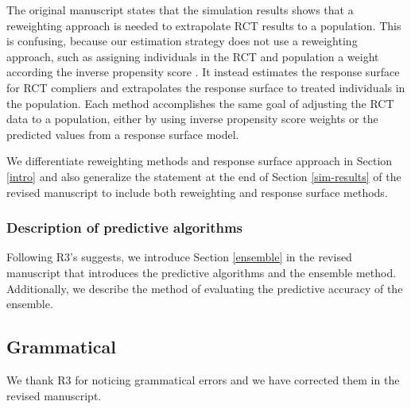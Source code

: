 \documentclass[hidelinks,12pt,letterpaper]{article}
\begin{document}
The original manuscript states that the simulation results shows that a reweighting approach is needed to extrapolate RCT results to a population. This is confusing, because our estimation strategy does not use a reweighting approach, such as assigning individuals in the RCT and population a weight according the inverse propensity score \citep{stuart2011use}. It instead estimates the response surface for RCT compliers and extrapolates the response surface to treated individuals in the population. Each method accomplishes the same goal of adjusting the RCT data to a population, either by using inverse propensity score weights or the predicted values from a response surface model. 

We differentiate reweighting methods and response surface approach in Section \ref{intro} and also generalize the statement at the end of Section \ref{sim-results} of the revised manuscript to include both reweighting and response surface methods. 

\subsubsection{Description of predictive algorithms}

Following R3's suggests, we introduce Section \ref{ensemble} in the revised manuscript that introduces the predictive algorithms and the ensemble method. Additionally, we describe the method of evaluating the predictive accuracy of the ensemble. 

\subsection{Grammatical}

We thank R3 for noticing grammatical errors and we have corrected them in the revised manuscript. 


\printbibliography
\end{document}
